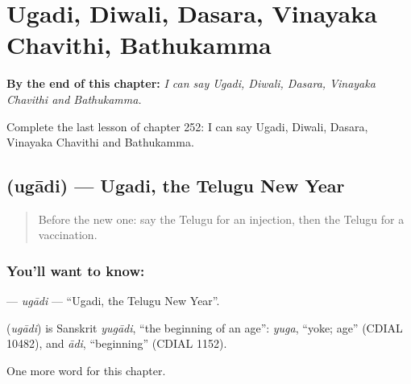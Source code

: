 
\chapter{Ugadi, Diwali, Dasara, Vinayaka Chavithi, Bathukamma}
\label{ch:te-ugadi-diwali-dasara-vinayaka-chavithi-bathukamma}

\begin{chapteropening}
\textbf{By the end of this chapter:} \emph{I can say Ugadi, Diwali, Dasara, Vinayaka Chavithi and Bathukamma.}

Complete the last lesson of chapter 252: I can say Ugadi, Diwali, Dasara, Vinayaka Chavithi and Bathukamma.
\end{chapteropening}

\section[\texorpdfstring{\te{ఉగాది} (ugādi)}{ఉగాది (ugādi)}]{ (ugādi) — Ugadi, the Telugu New Year}

\label{lesson:TE-C252-ugadi}



\begin{quote}
Before the new one: say the Telugu for an injection, then the Telugu for a vaccination.
\end{quote}

\subsection*{You'll want to know: }
\textbf{} — \emph{ugādi} — \textquotedblleft{}Ugadi, the Telugu New Year\textquotedblright{}.

\begin{cousinweb}
\textbf{} (\emph{ugādi}) is Sanskrit \emph{yugādi}, \textquotedblleft{}the beginning of an age\textquotedblright{}: \emph{yuga}, \textquotedblleft{}yoke; age\textquotedblright{} (CDIAL 10482), and \emph{ādi}, \textquotedblleft{}beginning\textquotedblright{} (CDIAL 1152).
\end{cousinweb}

\begin{grammarlens}[title={What you've built}]
One more word for this chapter.
\end{grammarlens}

